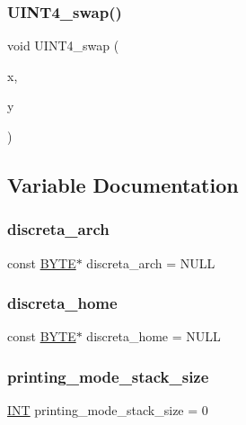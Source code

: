 \mbox{\label{global_8_c_a164267bed61273806a91cd1bb9c8b579}} 
\subsubsection{\texorpdfstring{U\+I\+N\+T4\+\_\+swap()}{UINT4\_swap()}}
{\footnotesize\ttfamily void U\+I\+N\+T4\+\_\+swap (\begin{DoxyParamCaption}\item[{\mbox{\hyperlink{galois_8h_ac94af6544c710549c9fca744fd510395}{U\+I\+N\+T4}} \&}]{x,  }\item[{\mbox{\hyperlink{galois_8h_ac94af6544c710549c9fca744fd510395}{U\+I\+N\+T4}} \&}]{y }\end{DoxyParamCaption})}



\subsection{Variable Documentation}
\mbox{\label{global_8_c_af6044514502c67e3178140359be347ec}} 
\subsubsection{\texorpdfstring{discreta\+\_\+arch}{discreta\_arch}}
{\footnotesize\ttfamily const \mbox{\hyperlink{galois_8h_ab6cc7b4aeb6ea31aba2b3fbfc83ff5e6}{B\+Y\+TE}}$\ast$ discreta\+\_\+arch = N\+U\+LL}

\mbox{\label{global_8_c_a95cd49b8fcd1d229d4155f19115aef89}} 
\subsubsection{\texorpdfstring{discreta\+\_\+home}{discreta\_home}}
{\footnotesize\ttfamily const \mbox{\hyperlink{galois_8h_ab6cc7b4aeb6ea31aba2b3fbfc83ff5e6}{B\+Y\+TE}}$\ast$ discreta\+\_\+home = N\+U\+LL}

\mbox{\label{global_8_c_aa649d2d3074fb4d8b6387f653683f49e}} 
\subsubsection{\texorpdfstring{printing\+\_\+mode\+\_\+stack\+\_\+size}{printing\_mode\_stack\_size}}
{\footnotesize\ttfamily \mbox{\hyperlink{galois_8h_a09fddde158a3a20bd2dcadb609de11dc}{I\+NT}} printing\+\_\+mode\+\_\+stack\+\_\+size = 0}

